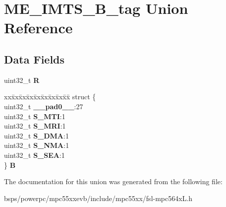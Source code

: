 \hypertarget{unionME__IMTS__32B__tag}{}\section{M\+E\+\_\+\+I\+M\+T\+S\+\_\+B\+\_\+tag Union Reference}
\label{unionME__IMTS__32B__tag}
\subsection*{Data Fields}
\begin{DoxyCompactItemize}
\item 
\mbox{\label{unionME__IMTS__32B__tag_a694633ea171de6f27f676a2794206af6}} 
uint32\+\_\+t {\bfseries R}
\item 
\mbox{\label{unionME__IMTS__32B__tag_af4cfb8364aea321ddaab22024eb7bae7}} 
\begin{tabbing}
xx\=xx\=xx\=xx\=xx\=xx\=xx\=xx\=xx\=\kill
struct \{\\
\>uint32\_t {\bfseries \_\_pad0\_\_}:27\\
\>uint32\_t {\bfseries S\_MTI}:1\\
\>uint32\_t {\bfseries S\_MRI}:1\\
\>uint32\_t {\bfseries S\_DMA}:1\\
\>uint32\_t {\bfseries S\_NMA}:1\\
\>uint32\_t {\bfseries S\_SEA}:1\\
\} {\bfseries B}\\

\end{tabbing}\end{DoxyCompactItemize}


The documentation for this union was generated from the following file\+:\begin{DoxyCompactItemize}
\item 
bsps/powerpc/mpc55xxevb/include/mpc55xx/fsl-\/mpc564x\+L.\+h\end{DoxyCompactItemize}
